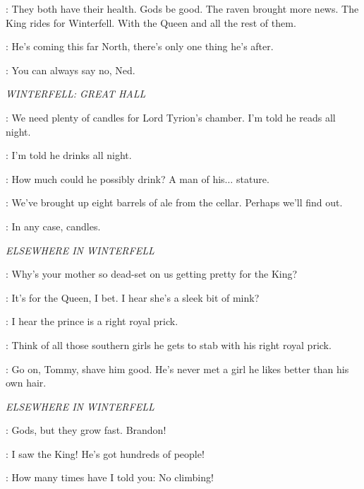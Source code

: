 \CATELYN: They both have their health. Gods be good. The raven brought more news. The King rides for Winterfell. With the Queen and all the rest of them. 

\NED: He's coming this far North, there's only one thing he's after. 

\CATELYN: You can always say no, Ned. 


\scene

\textit{WINTERFELL: GREAT HALL} 


\CATELYN: We need plenty of candles for Lord Tyrion's chamber. I'm told he reads all night. 

\LUWIN: I'm told he drinks all night. 

\CATELYN: How much could he possibly drink? A man of his$\ldots$ stature. 

\LUWIN: We've brought up eight barrels of ale from the cellar. Perhaps we'll find out. 

\CATELYN: In any case, candles. 


\scene

\textit{ELSEWHERE IN WINTERFELL} 


\JON:  Why's your mother so dead-set on us getting pretty for the King? 

\THEON: It's for the Queen, I bet. I hear she's a sleek bit of mink? 

\ROBB: I hear the prince is a right royal prick. 

\THEON: Think of all those southern girls he gets to stab with his right royal prick. 

\ROBB: Go on, Tommy, shave him good. He's never met a girl he likes better than his own hair. 


\scene

\textit{ELSEWHERE IN WINTERFELL} 


\CATELYN: Gods, but they grow fast.  Brandon! 

\BRAN: I saw the King! He's got hundreds of people! 

\CATELYN: How many times have I told you: No climbing! 

